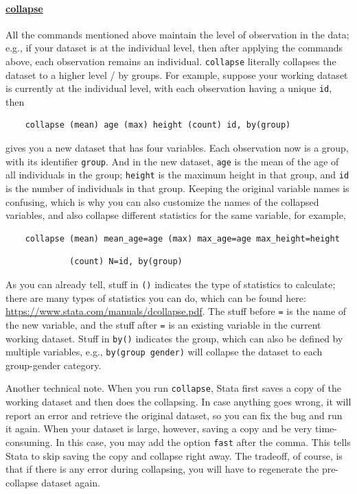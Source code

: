 \paragraph{\underline{collapse}} All the commands mentioned above maintain the level of observation in the data; e.g., if your dataset is at the individual level, then after applying the commands above, each observation remains an individual. \verb|collapse| literally collapses the dataset to a higher level / by groups. For example, suppose your working dataset is currently at the individual level, with each observation having a unique \verb|id|, then 
\begin{verbatim}
    collapse (mean) age (max) height (count) id, by(group)
\end{verbatim}
gives you a new dataset that has four variables. Each observation now is a group, with its identifier \verb|group|. And in the new dataset, \verb|age| is the mean of the age of all individuals in the group; \verb|height| is the maximum height in that group, and \verb|id| is the number of individuals in that group. Keeping the original variable names is confusing, which is why you can also customize the names of the collapsed variables, and also collapse different statistics for the same variable, for example, 
\begin{verbatim}
    collapse (mean) mean_age=age (max) max_age=age max_height=height 
\end{verbatim}
\begin{verbatim}
             (count) N=id, by(group)
\end{verbatim}
As you can already tell, stuff in \verb|()| indicates the type of statistics to calculate; there are many types of statistics you can do, which can be found here: \url{https://www.stata.com/manuals/dcollapse.pdf}. The stuff before \verb|=| is the name of the new variable, and the stuff after \verb|=| is an existing variable in the current working dataset. Stuff in \verb|by()| indicates the group, which can also be defined by multiple variables, e.g., \verb|by(group gender)| will collapse the dataset to each group-gender category. 

Another technical note. When you run \verb|collapse|, Stata first saves a copy of the working dataset and then does the collapsing. In case anything goes wrong, it will report an error and retrieve the original dataset, so you can fix the bug and run it again. When your dataset is large, however, saving a copy and be very time-consuming. In this case, you may add the option \verb|fast| after the comma. This tells Stata to skip saving the copy and collapse right away. The tradeoff, of course, is that if there is any error during collapsing, you will have to regenerate the pre-collapse dataset again. 

